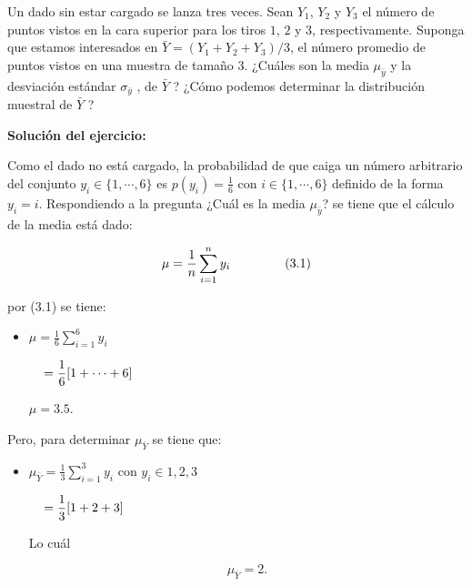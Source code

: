 \documentclass[
]{article}
\begin{document}
Un dado sin estar cargado se lanza tres veces. Sean $Y_{1}$, $Y_{2}$ y $Y_{3}$ el número de puntos vistos en la cara superior para los tiros $1$, $2$ y $3$, respectivamente. Suponga que estamos interesados en $\bar{Y} = (Y_{1} + Y_{2} + Y_{3} )/3$, el número promedio de puntos vistos en una muestra de tamaño $3$. ¿Cuáles son la media $\mu_{\bar{y}}$  y la desviación estándar $\sigma_{\bar{y}}$ , de $\bar{Y}$ ? ¿Cómo podemos determinar la
distribución muestral de $\bar{Y}$ ?


\textbf{Solución del ejercicio:}

\newenvironment{caja}{
  \begin{center}
  \begin{minipage}{0.9\textwidth}
  \begin{mdframed}[backgroundcolor=lightgray,linewidth=0pt]
}{
  \end{mdframed}
  \end{minipage}
  \end{center}
}


Como el dado no está cargado, la probabilidad de que caiga un número arbitrario del conjunto $y_{i} \in \{1,\cdots,6\}$ es $p(y_{i}) = \displaystyle \frac{1}{6}$ con $i \in \{1,\cdots,6\}$ definido de la forma $y_{i} = i$. Respondiendo a la pregunta  ¿Cuál es la media 
$\mu_{\bar{y}}$? se tiene que el cálculo de la media está dado: 

$$\mu = \frac{1}{n} \sum_{i=1}^{n}y_{i} \hspace{1.5cm} (3.1)$$

por (3.1) se tiene:

\begin{itemize}
  \item $\displaystyle \mu = \frac{1}{6}\sum_{i=1}^{6}y_{i}$
  
  $\displaystyle \hspace{0.4cm} = \frac{1}{6} [1+\cdots +6] $ 
  
  $\displaystyle  \mu = 3.5. $
\end{itemize}

Pero, para determinar $\mu_{\bar{Y}}$ se tiene que:

\begin{itemize}
  \item $\displaystyle \mu_{\bar{Y}} = \frac{1}{3}\sum_{i=1}^{3}y_{i}$ con $y_{i} \in {1,2,3}$
  
  $\displaystyle \hspace{0.4cm} = \frac{1}{3} [1+2+3] $ 
  
  Lo cuál
  
  $$ \displaystyle  \mu_{\bar{Y}} = 2. $$
\end{itemize}
\end{document}
